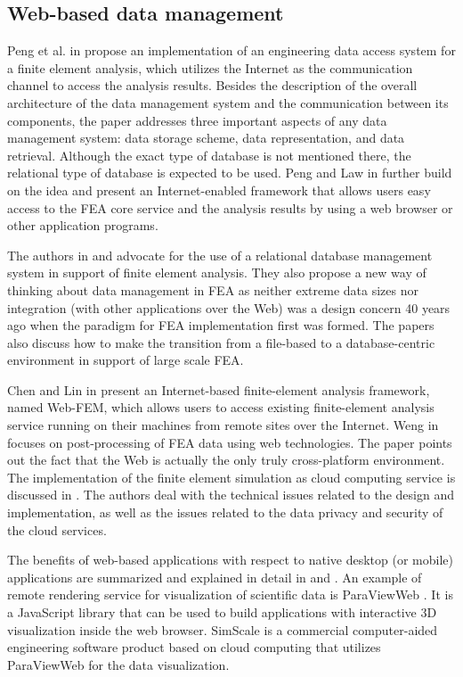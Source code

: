 \subsection{Web-based data management}

Peng et al. in \cite{Peng2003} propose an implementation of an engineering data access system for a finite element analysis, which utilizes the Internet as the communication channel to access the analysis results. Besides the description of the overall architecture of the data management system and the communication between its components, the paper addresses three important aspects of any data management system: data storage scheme, data representation, and data retrieval. Although the exact type of database is not mentioned there, the relational type of database is expected to be used. Peng and Law in \cite{Peng2004} further build on the idea and present an Internet-enabled framework that allows users easy access to the FEA core service and the analysis results by using a web browser or other application programs.

The authors in \cite{Heber2007I} and \cite{Heber2007II} advocate for the use of a relational database management system in support of finite element analysis. They also propose a new way of thinking about data management in FEA as neither extreme data sizes nor integration (with other applications over the Web) was a design concern 40 years ago when the paradigm for FEA implementation first was formed. The papers also discuss how to make the transition from a file-based to a database-centric environment in support of large scale FEA.

Chen and Lin in \cite{Chen2008} present an Internet-based finite-element analysis framework, named Web-FEM, which allows users to access existing finite-element analysis service running on their machines from remote sites over the Internet. Weng in \cite{Weng2011} focuses on post-processing of FEA data using web technologies. The paper points out the fact that the Web is actually the only truly cross-platform environment. The implementation of the finite element simulation as cloud computing service is discussed in \cite{Ari2013}. The authors deal with the technical issues related to the design and implementation, as well as the issues related to the data privacy and security of the cloud services.

The benefits of web-based applications with respect to native desktop (or mobile) applications are summarized and explained in detail in \cite{Mouton2011} and \cite{Charland2011}. An example of remote rendering service for visualization of scientific data is ParaViewWeb \cite{Jourdain2011}. It is a JavaScript library that can be used to build applications with interactive 3D visualization inside the web browser. SimScale \cite{SimScale} is a commercial computer-aided engineering software product based on cloud computing that utilizes ParaViewWeb for the data visualization.

